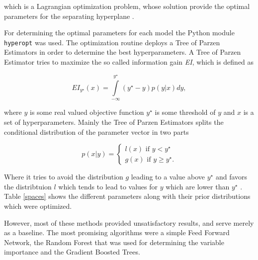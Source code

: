which is a Lagrangian optimization problem, whose solution provide the optimal parameters for the separating hyperplane \cite{svm}.

For determining the optimal parameters for each model the Python module \texttt{hyperopt} was used. The optimization routine deploys a Tree of Parzen Estimators in order to determine the best hyperparameters. A Tree of Parzen Estimator tries to maximize the so called information gain \textit{EI}, which is defined as

\begin{equation*}
EI_{y^\star}(x) = \int\limits_{-\infty}^{y^\star} (y^\star-y)p(y|x)dy,
\end{equation*}

where $y$ is some real valued objective function $y^\star$ is some threshold of $y$ and $x$ is a set of hyperparameters. Mainly the Tree of Parzen Estimators splits the conditional distribution of the parameter vector in two parts

\begin{equation*}
p(x|y) = \begin{cases}
    l(x) \text{ if } y<y^\star \\
    g(x) \text{ if } y \geq y^\star.
    \end{cases}
\end{equation*}

Where it tries to avoid the distribution $g$ leading to a value above $y^\star$ and favors the distribtuion $l$ which tends to lead to values for $y$ which are lower than $y^\star$ \cite{tpe}. Table \ref{spaces} shows the different parameters along with their prior distributions which were optimized.

However, most of these methods provided unsatisfactory results, and serve merely as a baseline. The most promising algorithms were a simple Feed Forward Network, the Random Forest that was used for determining the variable importance and the Gradient Boosted Trees.